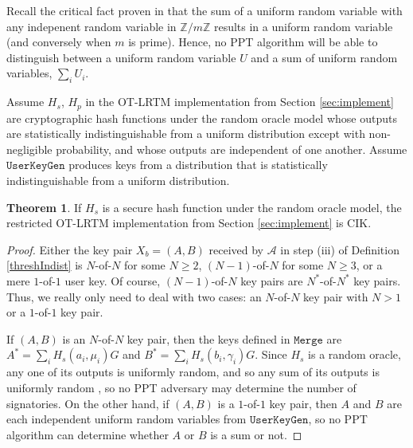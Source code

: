 \documentclass{mrl}
\theoremstyle{definition}
\newtheorem{theorem}{Theorem}[subsection]
\begin{document}
 Recall the critical fact proven in \cite{scozzafava1993uniform} that the sum of a uniform random variable with any indepenent random variable in $\mathbb{Z}/m\mathbb{Z}$ results in a uniform random variable (and conversely when $m$ is prime). Hence, no PPT algorithm will be able to distinguish between a uniform random variable $U$ and a sum of uniform random variables, $\sum_i U_i$. 
 
 Assume $H_s$, $H_p$ in the OT-LRTM implementation from Section \ref{sec:implement} are cryptographic hash functions under the random oracle model whose outputs are statistically indistinguishable from a uniform distribution except with non-negligible probability, and whose outputs are independent of one another. Assume $\texttt{UserKeyGen}$ produces keys from a distribution  that is statistically indistinguishable from a uniform distribution. 
 


\begin{theorem}
If $H_s$ is a secure hash function under the random oracle model, the restricted OT-LRTM implementation from Section \ref{sec:implement} is CIK.
\end{theorem}
\begin{proof}
Either the key pair $X_b = (A,B)$ received by $\mathcal{A}$ in step (iii) of Definition \ref{threshIndist} is $N$-of-$N$ for some $N \geq 2$, $(N-1)$-of-$N$ for some $N \geq 3$, or a mere $1$-of-$1$ user key. Of course, $(N-1)$-of-$N$ key pairs are $N^*$-of-$N^*$ key pairs. Thus, we really only need to deal with two cases: an $N$-of-$N$ key pair with $N > 1$ or a $1$-of-$1$ key pair.
  
If $(A,B)$ is an $N$-of-$N$ key pair, then the keys defined in $\texttt{Merge}$ are $A^* = \sum_{i} H_s(a_i, \mu_i) G$ and $B^* = \sum_i H_s(b_i, \gamma_i) G$. Since $H_s$ is a random oracle, any one of its outputs is uniformly random, and so any sum of its outputs is uniformly random \cite{scozzafava1993uniform}, so no PPT adversary may determine the number of signatories. On the other hand, if $(A,B)$ is a $1$-of-$1$ key pair, then $A$ and $B$ are each independent uniform random variables from $\texttt{UserKeyGen}$, so no PPT algorithm can determine whether $A$ or $B$ is a sum or not.
  
\end{proof}
  
\end{document}
